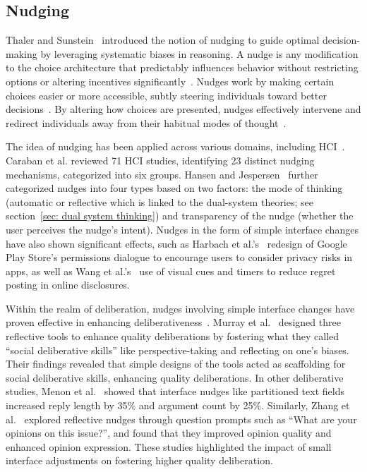 \subsection{Nudging}
\label{sec: nudging}
Thaler and Sunstein~\cite{thaler2008nudge, Thaler_2009} introduced the notion of nudging to guide optimal decision-making by leveraging systematic biases in reasoning. A nudge is any modification to the choice architecture that predictably influences behavior without restricting options or altering incentives significantly~\cite{caraban201923}. Nudges work by making certain choices easier or more accessible, subtly steering individuals toward better decisions~\cite{thaler2008nudge}. By altering how choices are presented, nudges effectively intervene and redirect individuals away from their habitual modes of thought~\cite{thaler2008nudge, Thaler_2009}.%

The idea of nudging has been applied across various domains, including HCI~\cite{caraban201923, lee2011mining}. Caraban et al.\cite{caraban201923} reviewed 71 HCI studies, identifying 23 distinct nudging mechanisms, categorized into six groups. Hansen and Jespersen~\cite{hansen2013nudge} further categorized nudges into four types based on two factors: the mode of thinking (automatic or reflective which is linked to the dual-system theories; see section~\ref{sec: dual system thinking}) and transparency of the nudge (whether the user perceives the nudge's intent). Nudges in the form of simple interface changes have also shown significant effects, such as Harbach et al.'s~\cite{harbach2014using} redesign of Google Play Store's permissions dialogue to encourage users to consider privacy risks in apps, as well as Wang et al.'s~\cite{wang2014field} use of visual cues and timers to reduce regret posting in online disclosures.

Within the realm of deliberation, nudges involving simple interface changes have proven effective in enhancing deliberativeness~\cite{xiao2015design, zhang2013structural}. Murray et al.~\cite{murray2013supporting} designed three reflective tools to enhance quality deliberations by fostering what they called ``social deliberative skills'' like perspective-taking and reflecting on one's biases. Their findings revealed that simple designs of the tools acted as scaffolding for social deliberative skills, enhancing quality deliberations. In other deliberative studies, Menon et al.~\cite{menon2020nudge} showed that interface nudges like partitioned text fields increased reply length by 35\% and argument count by 25\%. Similarly, Zhang et al.~\cite{zhang2021nudge} explored reflective nudges through question prompts such as ``What are your opinions on this issue?'', and found that they improved opinion quality and enhanced opinion expression. These studies highlighted the impact of small interface adjustments on fostering higher quality deliberation.

